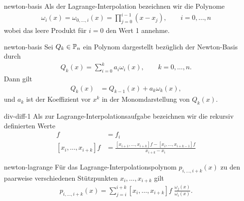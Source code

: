\begin{Definition}{newton-basis}
  Als  der Lagrange-Interpolation bezeichnen wir
  die Polynome
  \begin{gather}
    \omega_i(x)
    = \omega_{0,\dots,i}(x)
    = \prod_{j=0}^{i-1} (x-x_j),
    \qquad i=0,\dots,n
  \end{gather}
  wobei das leere Produkt für $i=0$ den Wert 1 annehme.
\end{Definition}

\begin{Lemma}{newton-basis}
  Sei $Q_k\in \P_n$ ein Polynom dargestellt bezüglich der Newton-Basis
  durch
  \begin{gather}
    Q_k(x) = \sum_{i=0}^k a_i \omega_i(x),\qquad k=0,\dots,n.
  \end{gather}
  Dann gilt
  \begin{align}
    Q_k(x) &= Q_{k-1}(x) + a_k \omega_k(x),
  \end{align}
  und $a_k$ ist der Koeffizient vor $x^k$ in der Monomdarstellung von
  $Q_k(x)$.
\end{Lemma}

\begin{Definition}{div-diff-1}
  Als  zur
  Lagrange-Interpolationsaufgabe bezeichnen wir die rekursiv
  definierten Werte
  \begin{align}
    [x_i]f
    &= f_i \\
    [x_i,\dots,x_{i+k}]f
    &= \frac{[x_{i+1},\dots,x_{i+k}]f - [x_i,\dots,x_{i+k-1}]f}{x_{i+k}-x_i}
  \end{align}
\end{Definition}

\begin{Satz}{newton-lagrange}
  Für das Lagrange-Interpolationspolynom $p_{i,\dots,i+k}(x)$ zu den
  paarweise verschiedenen Stützpunkten $x_i,\dots,x_{i+k}$ gilt
  \begin{gather}
    p_{i,\dots,i+k}(x)
    = \sum_{j=i}^{i+k} [x_i,\dots,x_{i+k}]f\; \frac{\omega_j(x)}{\omega_i(x)}.
  \end{gather}
\end{Satz}

